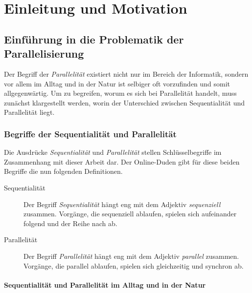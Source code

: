 
\chapter{Einleitung und Motivation}

	\section{Einführung in die Problematik der Parallelisierung}

		Der Begriff der \textit{Parallelität} existiert nicht nur im Bereich der Informatik, sondern vor allem im Alltag und in der Natur ist selbiger oft vorzufinden und somit allgegenwärtig. Um zu begreifen, worum es sich bei Parallelität handelt, muss zunächst klargestellt werden, worin der Unterschied zwischen Sequentialität und Parallelität liegt.

		\subsection{Begriffe der Sequentialität und Parallelität}

			Die Ausdrücke \textit{Sequentialität} und \textit{Parallelität} stellen Schlüsselbegriffe im Zusammenhang mit dieser Arbeit dar. Der Online-Duden gibt für diese beiden Begriffe die nun folgenden Definitionen.
			
			\begin{description}
			  \item[Sequentialität]
				  Der Begriff \textit{Sequentialität} hängt eng mit dem Adjektiv \textit{sequenziell} zusammen. Vorgänge, die sequenziell ablaufen, spielen sich aufeinander folgend und der Reihe nach ab. \cite{SequentiellDuden}
			  \item[Parallelität]
				  Der Begriff \textit{Parallelität} hängt eng mit dem Adjektiv \textit{parallel} zusammen. Vorgänge, die parallel ablaufen, spielen sich gleichzeitig und synchron ab. \cite{ParallelDuden}
			\end{description}

			\subsubsection{Sequentialität und Parallelität im Alltag und in der Natur}
			
